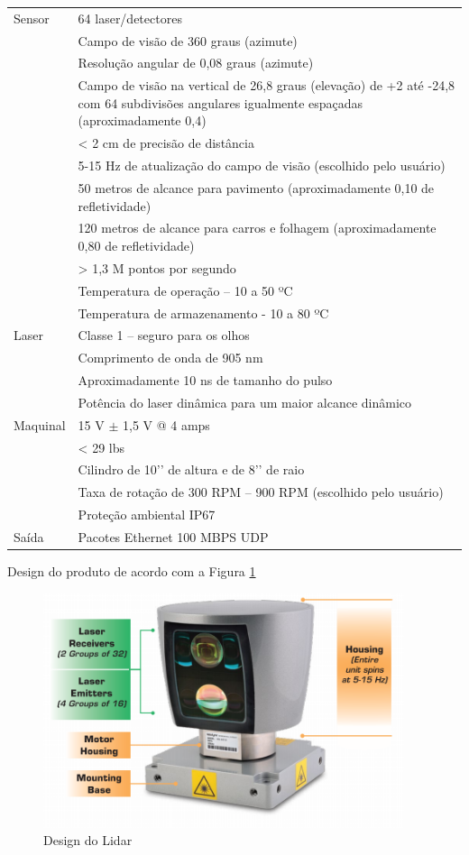 \begin{enumerate}
\begin{table}
\begin{tabular}{|p{8cm}|p{8cm}|}
\hline
Sensor & 64 laser/detectores\\ 
& Campo de visão de 360 graus (azimute)\\ 
& Resolução angular de 0,08 graus (azimute)\\  
& Campo de visão na vertical de 26,8 graus (elevação) de +2 até -24,8 com 64 subdivisões angulares igualmente espaçadas (aproximadamente 0,4)\\  
& < 2 cm de precisão de distância\\  
& 5-15 Hz de atualização do campo de visão (escolhido pelo usuário)\\  
& 50 metros de alcance para pavimento (aproximadamente 0,10 de refletividade)\\  
& 120 metros de alcance para carros e folhagem (aproximadamente 0,80 de refletividade)\\  
& > 1,3 M pontos por segundo\\ 
& Temperatura de operação – 10 a 50 ºC\\  
& Temperatura de armazenamento - 10 a 80 ºC\\  \hline
Laser & Classe 1 – seguro para os olhos\\ 
& Comprimento de onda de 905 nm\\ 
& Aproximadamente 10 ns de tamanho do pulso\\ 
& Potência do laser dinâmica para um maior alcance dinâmico\\ \hline
Maquinal & 15 V $\pm$ 1,5 V @ 4 amps\\ 
& < 29 lbs\\ 
& Cilindro de 10’’ de altura e de 8’’ de raio\\ 
& Taxa de rotação de 300 RPM – 900 RPM (escolhido pelo usuário)\\ 
& Proteção ambiental IP67\\ \hline
Saída & Pacotes Ethernet 100 MBPS UDP \\ \hline
\end{tabular}
\end{table}

Design do produto de acordo com a Figura \ref{fig:design_lidar}

\begin{figure}[h]
  \centering
  \includegraphics[width=400px, scale=1]{figuras/design_lidar}
  \caption{Design do Lidar}
\label{fig:design_lidar}
\end{figure}


\end{enumerate}
